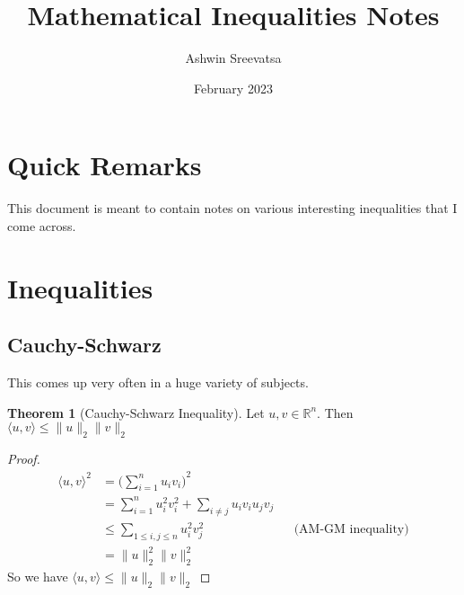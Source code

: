 \documentclass[answers,12pt]{exam}
\title{Mathematical Inequalities Notes}
\author{Ashwin Sreevatsa}
\date{February 2023}
\theoremstyle{definition}
\newtheorem{theorem}{Theorem}
\begin{document}
\maketitle

\section*{Quick Remarks}
This document is meant to contain notes on various interesting inequalities that I come across.


\section{Inequalities}

\subsection{Cauchy-Schwarz}
This comes up very often in a huge variety of subjects.
\begin{theorem}[Cauchy-Schwarz Inequality]
    Let $u,v \in \mathbb{R}^n$. Then $\langle u, v \rangle \leq \lVert u \rVert_2 \lVert v \rVert_2 $
\end{theorem}

\begin{proof}
    \[
        \begin{aligned}
            \langle u, v \rangle^2 &= {\Big(\sum_{i=1}^n u_i v_i \Big)}^2 \\
            &= \sum_{i=1}^n u_i^2 v_i^2 + \sum_{i \neq j} u_i v_i u_j v_j \\
            &\leq \sum_{1 \leq i,j \leq n} u_i^2 v_j^2 && \text{(AM-GM inequality)}\\
            &= \lVert u \rVert_2^2 \lVert v \rVert_2^2
        \end{aligned}
    \]
    So we have $\langle u, v \rangle \leq \lVert u \rVert_2 \lVert v \rVert_2 $
\end{proof}
\end{document}
